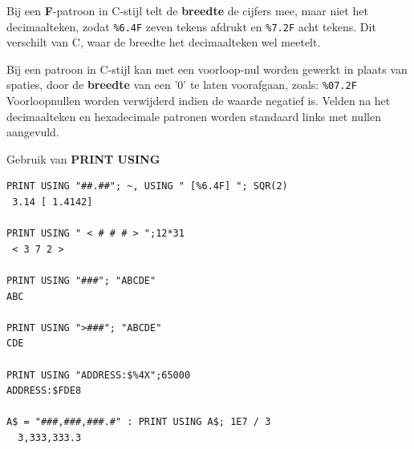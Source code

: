 \begin{description}[leftmargin=2cm,style=nextline]
                  Bij een {\bf F}-patroon in C-stijl telt de {\bf breedte} de cijfers mee, maar niet het decimaalteken, zodat \texttt{\%6.4F} zeven tekens afdrukt en \texttt{\%7.2F} acht tekens. Dit verschilt van C, waar de breedte het decimaalteken wel meetelt.

                  Bij een patroon in C-stijl kan met een voorloop-nul worden gewerkt in plaats van spaties, door de {\bf breedte} van een '0' te laten voorafgaan, zoals: \texttt{\%07.2F} Voorloopnullen worden verwijderd indien de waarde negatief is. Velden na het decimaalteken en hexadecimale patronen worden standaard links met nullen aangevuld.

\newpage
\item [Voorbeelden:] Gebruik van {\bf PRINT USING}

\begin{tcolorbox}[colback=black,coltext=white]
\verbatimfont{\codefont}
\begin{verbatim}
PRINT USING "##.##"; ~, USING " [%6.4F] "; SQR(2)
 3.14 [ 1.4142]

PRINT USING " < # # # > ";12*31
 < 3 7 2 >

PRINT USING "###"; "ABCDE"
ABC

PRINT USING ">###"; "ABCDE"
CDE

PRINT USING "ADDRESS:$%4X";65000
ADDRESS:$FDE8

A$ = "###,###,###.#" : PRINT USING A$; 1E7 / 3
  3,333,333.3
\end{verbatim}
\end{tcolorbox}
\end{description}


\newpage
